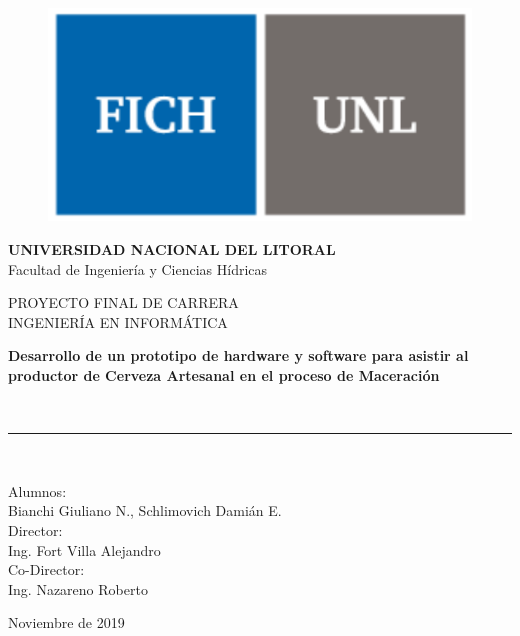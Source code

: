 \begin{titlepage}
	\cleardoublepage
	\frontmatter
	\begin{center}
		\begin{figure}
			\centerline{\includegraphics[scale=0.75]{fichunl.pdf}}
			\label{logo}
		\end{figure}
		\begin{Large}
			\textbf{UNIVERSIDAD NACIONAL DEL LITORAL} \\
			Facultad de Ingeniería y Ciencias Hídricas\\
			\vspace*{1cm}
		\end{Large}
		\vspace*{0.5cm}
		PROYECTO FINAL DE CARRERA\\
		INGENIERÍA EN INFORMÁTICA\\
		\vspace*{1.5cm}
		\begin{Large}
			\textbf{Desarrollo de un prototipo de hardware y software para asistir al productor de Cerveza Artesanal en el proceso de Maceración}
		\end{Large}
		\\
		\vspace*{1cm}
		\rule{100mm}{0.1mm}\\
		\vspace*{1.5cm}
		\begin{large}
			Alumnos: \\
			Bianchi Giuliano N., Schlimovich Damián E.\\
			\vspace*{0.5cm}
			Director: \\
			Ing. Fort Villa Alejandro   \\
			\vspace*{0.5cm}
			Co-Director: \\
			Ing. Nazareno Roberto\\
		\end{large}
		\vspace*{2.5cm}
		\begin{center}
			Noviembre de 2019\textsl{}
		\end{center}
	\end{center}
\end{titlepage}